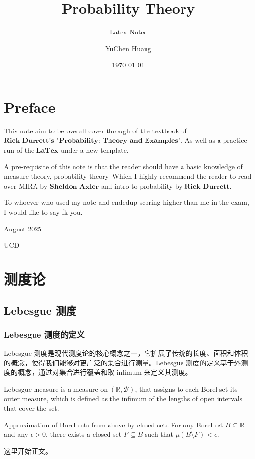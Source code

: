\documentclass[lang=cn,newtx,11pt,scheme=chinese]{elegantbook}
\title{Probability Theory}
\subtitle{Latex Notes}
\author{YuChen Huang}
\institute{Self Study}
\date{\today}
\begin{document}
\maketitle
\frontmatter

\tableofcontents

\mainmatter
\chapter{Preface}
This note aim to be overall cover through of the textbook of $\textbf{Rick Durrett's "Probability: Theory and Examples"}$. As well as a practice run of the $\textbf{LaTex}$ under a new template.

A pre-requisite of this note is that the reader should have a basic knowledge of measure theory, probability theory. Which I highly recommend the reader to read over MIRA by $\textbf{Sheldon Axler}$ and intro to probability by $\textbf{Rick Durrett}$.

To whoever who used my note and endedup scoring higher than me in the exam, I would like to say fk you. 

August 2025

UCD

\chapter{测度论}


\section{Lebesgue 测度}
\subsection{Lebesgue 测度的定义}
Lebesgue 测度是现代测度论的核心概念之一，它扩展了传统的长度、面积和体积的概念，使得我们能够对更广泛的集合进行测量。Lebesgue 测度的定义基于外测度的概念，通过对集合进行覆盖和取 infimum 来定义其测度。
\begin{definition}
    Lebesgue measure is a measure on $(\mathbb{R}, \mathcal{B})$, that assigns to each Borel set its outer measure, which is defined as the infimum of the lengths of open intervals that cover the set.
\end{definition}

\begin{lemma}{Approximation of Borel sets from above by closed sets}
    For any Borel set $B \subseteq \mathbb{R}$ and any $\epsilon > 0$, there exists a closed set $F \subseteq B$ such that $\mu(B \setminus F) < \epsilon$. 
    
\end{lemma}
这里开始正文。
\end{document}
